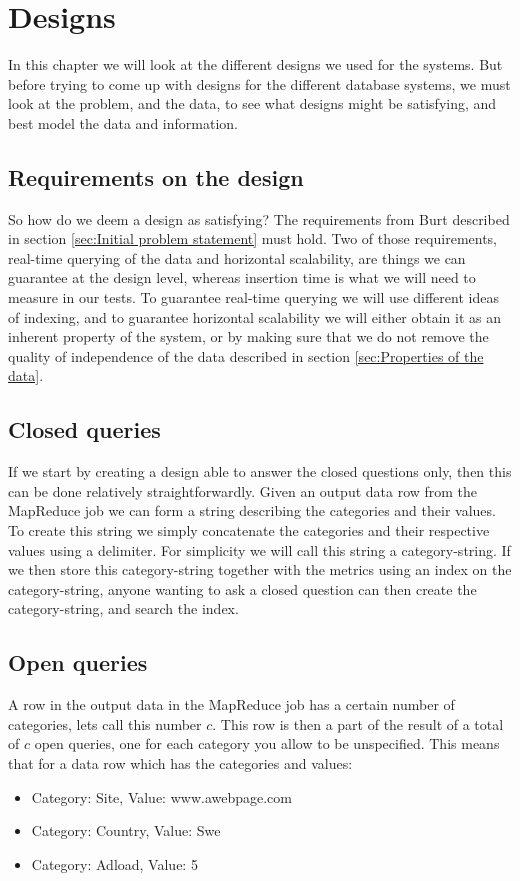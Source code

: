 \pagebreak

\chapter{Designs}
In this chapter we will look at the different designs we used for the systems. But before trying to come up with designs for the different database systems, we must look at the problem, and the data, to see what designs might be satisfying, and best model the data and information.
\section{Requirements on the design}
So how do we deem a design as satisfying? The requirements from Burt described in section \ref{sec:Initial problem statement} must hold. Two of those requirements, real-time querying of the data and horizontal scalability, are things we can guarantee at the design level, whereas insertion time is what we will need to measure in our tests. To guarantee real-time querying we will use different ideas of indexing, and to guarantee horizontal scalability we will either obtain it as an inherent property of the system, or by making sure that we do not remove the quality of independence of the data described in section \ref{sec:Properties of the data}.
\section{Closed queries} \label{sec:Closed queries}
If we start by creating a design able to answer the closed questions only, then this can be done relatively straightforwardly. Given an output data row from the MapReduce job we can form a string describing the categories and their values. To create this string we simply concatenate the categories and their respective values using a delimiter. For simplicity we will call this string a category-string. If we then store this category-string together with the metrics using an index on the category-string, anyone wanting to ask a closed question can then create the category-string, and search the index.
\section{Open queries} \label{sec:Open queries}
A row in the output data in the MapReduce job has a certain number of categories, lets call this number $c$. This row is then a part of the result of a total of $c$ open queries, one for each category you allow to be unspecified. This means that for a data row which has the categories and values:
\begin{itemize}
\item Category: Site, Value: www.awebpage.com
\item Category: Country, Value: Swe
\item Category: Adload, Value: 5
\end{itemize}

